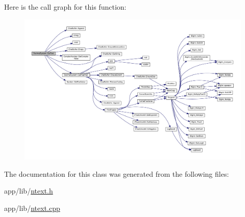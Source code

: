 Here is the call graph for this function\+:\nopagebreak
\begin{figure}[H]
\begin{center}
\leavevmode
\includegraphics[width=350pt]{classDecimalSystem_ab43f764ed35fe831a16a356bbdc72441_cgraph}
\end{center}
\end{figure}




The documentation for this class was generated from the following files\+:\begin{DoxyCompactItemize}
\item 
app/lib/\hyperlink{ntext_8h}{ntext.\+h}\item 
app/lib/\hyperlink{ntext_8cpp}{ntext.\+cpp}\end{DoxyCompactItemize}
